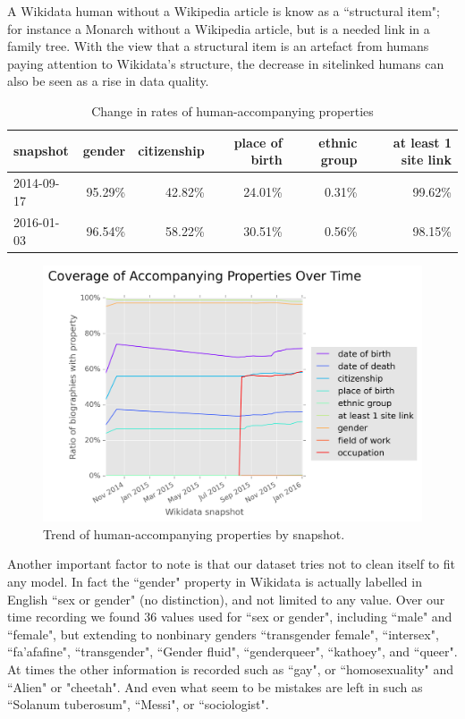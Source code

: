 \documentclass{sigchi-ext}
\begin{document}
A Wikidata human without a Wikipedia article is know as a ``structural item"; for instance a Monarch without a Wikipedia article, but is a needed link in a family tree. With the view that a structural item is an artefact from humans paying attention to Wikidata's structure, the decrease in sitelinked humans can also be seen as a rise in data quality.

\begin{table}
\caption{Change in rates of human-accompanying properties}
\begin{tabular}{lrrrrr}
\toprule
snapshot &  gender &  citizenship &  place of birth &  ethnic group &  at least 1 site link \\
\midrule
2014-09-17 &  95.29\% &       42.82\% &          24.01\% &         0.31\% &                99.62\% \\
2016-01-03 &  96.54\% &       58.22\% &          30.51\% &         0.56\% &                98.15\% \\
\bottomrule
\end{tabular}

\label{table:accompanying}
\end{table}

\begin{figure}
\label{fig:accompanying}
\includegraphics[scale=0.6]{figures/additionalprops.png} 
\caption{Trend of human-accompanying properties by snapshot.}
\end{figure}

Another important factor to note is that our dataset tries not to clean itself to fit any model. In fact the ``gender" property in Wikidata is actually labelled in English ``sex or gender" (no distinction), and not limited to any value. Over our time recording we found 36 values used for ``sex or gender", including ``male" and ``female", but extending to nonbinary genders ``transgender female", ``intersex", ``fa'afafine", ``transgender", ``Gender fluid",  ``genderqueer", ``kathoey", and ``queer". At times the other information is recorded such as ``gay", or ``homosexuality" and ``Alien" or "cheetah". And even what seem to be mistakes are left in such as  ``Solanum tuberosum", ``Messi", or ``sociologist".
\end{document}
